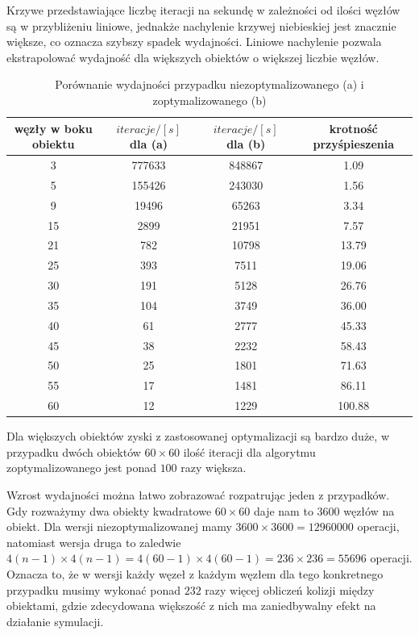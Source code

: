 \documentclass[12pt, letterpaper]{report}
\begin{document}
    Krzywe przedstawiające liczbę iteracji na sekundę w zależności od ilości węzłów są w przybliżeniu liniowe,
    jednakże nachylenie krzywej niebieskiej jest znacznie większe, co oznacza szybszy spadek wydajności.
    Liniowe nachylenie pozwala ekstrapolować wydajność dla większych obiektów o większej liczbie węzłów. \\

    \begin{table}[H]
        \centering
        \begin{tabular}{||c c c c||} 
            \hline
            węzły w boku obiektu & $iteracje / [s]$ dla (a) & $iteracje / [s]$ dla (b) & krotność przyśpieszenia \\ [0.5ex] 
            \hline\hline
            3 & 777633 & 848867 & 1.09 \\ 
            \hline
            5 & 155426 & 243030 & 1.56 \\
            \hline
            9 & 19496 & 65263 & 3.34 \\
            \hline
            15 & 2899 & 21951 & 7.57 \\
            \hline
            21 & 782 & 10798 & 13.79 \\
            \hline
            25 & 393 & 7511 & 19.06 \\
            \hline
            30 & 191 & 5128 & 26.76 \\
            \hline
            35 & 104 & 3749 & 36.00 \\
            \hline
            40 & 61 & 2777 & 45.33 \\ 
            \hline
            45 & 38 & 2232 & 58.43 \\ 
            \hline
            50 & 25 & 1801 & 71.63 \\
            \hline
            55 & 17 & 1481 & 86.11 \\ 
            \hline
            60 & 12 & 1229 & 100.88 \\ [1ex] 
            \hline
        \end{tabular}
        \caption{ Porównanie wydajności przypadku niezoptymalizowanego (a) i zoptymalizowanego (b) }
    \end{table}
    Dla większych obiektów zyski z zastosowanej optymalizacji są bardzo duże, w przypadku dwóch obiektów
    $60 \times 60$ ilość iteracji dla algorytmu zoptymalizowanego jest ponad $100$ razy większa.

    Wzrost wydajności można łatwo zobrazować rozpatrując jeden z przypadków. Gdy rozważymy dwa 
    obiekty kwadratowe $60 \times 60$ daje nam to $3600$ węzłów na obiekt.
    Dla wersji niezoptymalizowanej mamy $3600 \times 3600 = 12960000$ operacji, natomiast wersja druga to zaledwie
    $4(n - 1) \times 4(n - 1) = 4(60 - 1) \times 4(60 - 1) = 236 \times 236 = 55696$ operacji. Oznacza to, że 
    w wersji każdy węzeł z każdym węzłem dla tego konkretnego przypadku musimy wykonać ponad $232$ razy więcej obliczeń
    kolizji między obiektami, gdzie zdecydowana większość z nich ma zaniedbywalny efekt na działanie symulacji. \\
\end{document}
